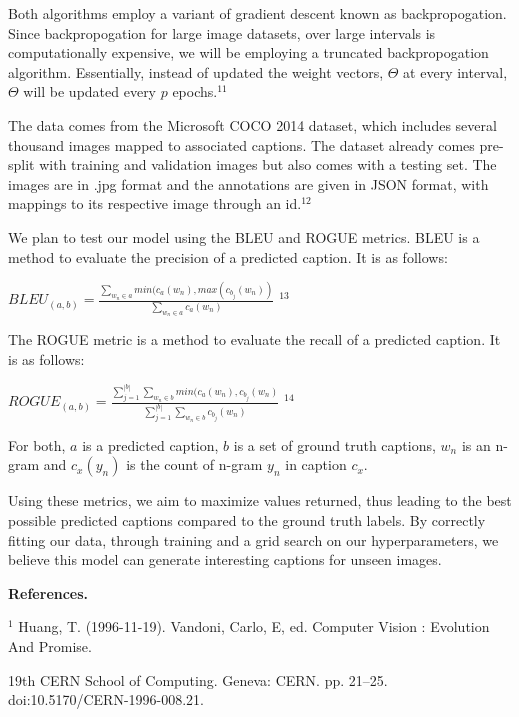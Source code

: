 \documentclass[10pt, oneside]{article}   	%
\begin{document}
Both algorithms employ a variant of gradient descent known as backpropogation. Since backpropogation for large image datasets, over large intervals is computationally expensive, we will be employing a truncated backpropogation algorithm. Essentially, instead of updated the weight vectors, $\Theta$ at every interval, $\Theta$ will be updated every $p$ epochs.$^{11}$ 

The data comes from the Microsoft COCO 2014 dataset, which includes several thousand images mapped to associated captions. The dataset already comes pre-split with training and validation images but also comes with a testing set. The images are in .jpg format and the annotations are given in JSON format, with mappings to its respective image through an id.$^{12}$

We plan to test our model using the BLEU and ROGUE metrics. BLEU is a method to evaluate the precision of a predicted caption. It is as follows:

\begin{center}
	$BLEU_{(a,b)} = \frac{\sum_{w_n \in a} min(c_a(w_n),max(c_{b_j}(w_n))}{\sum_{w_n \in a} c_a(w_n)}$ $^{13}$
\end{center}

The ROGUE metric is a method to evaluate the recall of a predicted caption. It is as follows:

\begin{center}
	$ROGUE_{(a,b)} = \frac{\sum_{j=1}^{|b|}\sum_{w_n \in b} min(c_a(w_n),c_{b_j}(w_n)}{\sum_{j=1}^{|b|}\sum_{w_n \in b} c_{b_j}(w_n)}$ $^{14}$
\end{center}

For both, $a$ is a predicted caption, $b$ is a set of ground truth captions, $w_n$ is an n-gram and $c_x(y_n)$ is the count of n-gram $y_n$ in caption $c_x$.

Using these metrics, we aim to maximize values returned, thus leading to the best possible predicted captions compared to the ground truth labels. By correctly fitting our data, through training and a grid search on our hyperparameters, we believe this model can generate interesting captions for unseen images.

\vspace{3mm}
\textbf{References.}

$^1$ Huang, T. (1996-11-19). Vandoni, Carlo, E, ed. Computer Vision : Evolution And Promise.

19th CERN School of Computing. Geneva: CERN. pp. 21–25. doi:10.5170/CERN-1996-008.21. 
\end{document}
